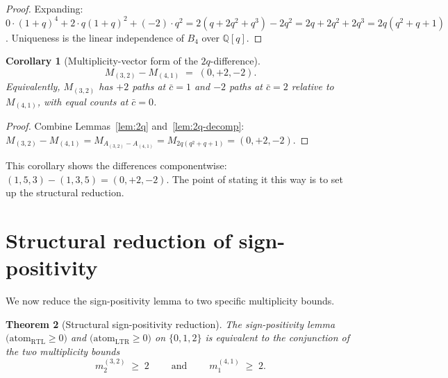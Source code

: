 \documentclass[11pt]{article}
\newtheorem{theorem}{Theorem}
\newtheorem{corollary}[theorem]{Corollary}
\theoremstyle{definition}
\begin{document}
\begin{proof}
Expanding: $0 \cdot (1+q)^4 + 2 \cdot q(1+q)^2 + (-2) \cdot q^2 = 2(q + 2q^2 + q^3) - 2q^2 = 2q + 2q^2 + 2q^3 = 2q(q^2 + q + 1)$. Uniqueness is the linear independence of $B_4$ over $\mathbb{Q}[q]$.
\end{proof}

\begin{corollary}[Multiplicity-vector form of the $2q$-difference]\label{cor:diff}
\[
M_{(3,2)} - M_{(4,1)} \;=\; (0, +2, -2).
\]
Equivalently, $M_{(3,2)}$ has $+2$ paths at $\bar c = 1$ and $-2$ paths at $\bar c = 2$ relative to $M_{(4,1)}$, with equal counts at $\bar c = 0$.
\end{corollary}

\begin{proof}
Combine Lemmas~\ref{lem:2q} and~\ref{lem:2q-decomp}: $M_{(3,2)} - M_{(4,1)} = M_{A_{(3,2)} - A_{(4,1)}} = M_{2q(q^2+q+1)} = (0, +2, -2)$.
\end{proof}

This corollary shows the differences componentwise: $(1,5,3) - (1,3,5) = (0, +2, -2)$. The point of stating it this way is to set up the structural reduction.

\section{Structural reduction of sign-positivity}

We now reduce the sign-positivity lemma to two specific multiplicity bounds.

\begin{theorem}[Structural sign-positivity reduction]\label{thm:reduction}
The sign-positivity lemma $\bigl(\mathrm{atom}_{\mathrm{RTL}} \geq 0\bigr)$ \emph{and} $\bigl(\mathrm{atom}_{\mathrm{LTR}} \geq 0\bigr)$ on $\{0, 1, 2\}$ is equivalent to the conjunction of the two multiplicity bounds
\[
\boxed{\;m^{(3,2)}_2 \;\geq\; 2\;} \qquad \text{and} \qquad \boxed{\;m^{(4,1)}_1 \;\geq\; 2.\;}
\]
\end{theorem}
\end{document}
